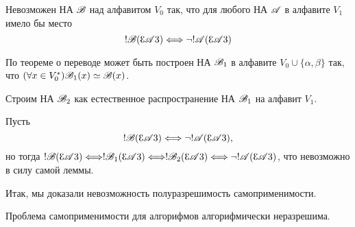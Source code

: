 \begin{theorem}
Невозможен НА $\mathscr{B}$ над алфавитом $V_0$ так, что для любого НА $\mathscr{A}$ в алфавите
$V_1$ имело бы место
\[
    !\scr{B}(\zap{\scr{A}}) \Longleftrightarrow \lnot ! \scr{A}(\zap{\scr{A}})
\] 
\end{theorem}

\begin{myproof}
По теореме о переводе может быть построен НА $\mathscr{B}_1$ в алфавите $V_0 \cup \{\alpha,\beta\}$ так,
что $(\forall x \in V^{*}_0)\mathscr{B}_1(x) \simeq \mathscr{B}(x)$.

Строим НА $\mathscr{B}_2$ как естественное распространение НА $\mathscr{B}_1$ на алфавит $V_1$.

\medskip

Пусть
\[
    !\scr{B}(\zap{\scr{A}}) \Longleftrightarrow \lnot !\scr{A}(\zap{\scr{A}}),
\]
но тогда $!\scr{B}(\zap{\scr{A}}) \Longleftrightarrow !\scr{B}_1(\zap{\scr{A}})
\Longleftrightarrow !\scr{B}_2(\zap{\scr{A}}) \Longleftrightarrow \lnot !\scr{A}(\zap{\scr{A}})$,
что невозможно в силу самой леммы.
\end{myproof}

Итак, мы доказали невозможность полуразрешимость самоприменимости.

Проблема самоприменимости для алгорифмов алгорифмически неразрешима.


